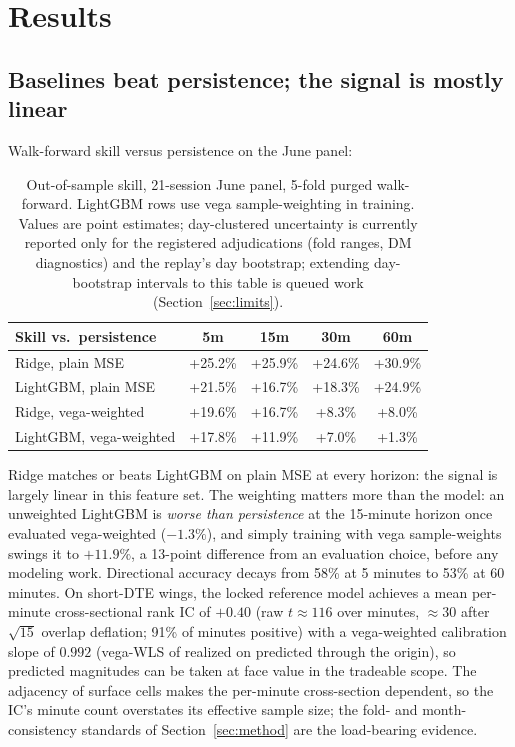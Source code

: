 \documentclass[11pt]{article}
\begin{document}
\section{Results}
\label{sec:results}

\subsection{Baselines beat persistence; the signal is mostly linear}

Walk-forward skill versus persistence on the June panel:

\begin{table}[h]
\centering
\begin{tabular}{lcccc}
\toprule
Skill vs.\ persistence & 5m & 15m & 30m & 60m \\
\midrule
Ridge, plain MSE        & +25.2\% & +25.9\% & +24.6\% & +30.9\% \\
LightGBM, plain MSE     & +21.5\% & +16.7\% & +18.3\% & +24.9\% \\
\addlinespace
Ridge, vega-weighted    & +19.6\% & +16.7\% & +8.3\%  & +8.0\%  \\
LightGBM, vega-weighted & +17.8\% & +11.9\% & +7.0\%  & +1.3\%  \\
\bottomrule
\end{tabular}
\caption{Out-of-sample skill, 21-session June panel, 5-fold purged
walk-forward. LightGBM rows use vega sample-weighting in training. Values
are point estimates; day-clustered uncertainty is currently reported only
for the registered adjudications (fold ranges, DM diagnostics) and the
replay's day bootstrap; extending day-bootstrap intervals to this table
is queued work (Section~\ref{sec:limits}).}
\label{tab:june}
\end{table}

Ridge matches or beats LightGBM on plain MSE at every horizon: the signal is
largely linear in this feature set. The weighting matters more than the
model: an unweighted LightGBM is \emph{worse than persistence} at the
15-minute horizon once evaluated vega-weighted ($-1.3\%$), and simply
training with vega sample-weights swings it to $+11.9\%$, a 13-point difference from an evaluation choice, before any modeling work.
Directional accuracy decays from 58\% at 5 minutes to 53\% at 60 minutes.
On short-DTE wings, the locked reference model achieves a mean per-minute
cross-sectional rank IC of $+0.40$ (raw $t\approx116$ over minutes,
$\approx 30$ after $\sqrt{15}$ overlap deflation; 91\% of minutes positive)
with a vega-weighted calibration slope of $0.992$ (vega-WLS of realized on
predicted through the origin), so predicted magnitudes can be taken at face
value in the tradeable scope. The adjacency of surface cells makes the
per-minute cross-section dependent, so the IC's minute count overstates its
effective sample size; the fold- and month-consistency standards of
Section~\ref{sec:method} are the load-bearing evidence.
\end{document}
